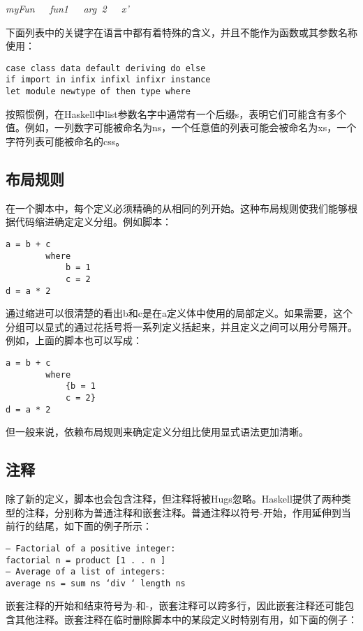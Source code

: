 \textit{myFun~~~fun1~~~arg~2~~~x’}

下面列表中的关键字在语言中都有着特殊的含义，并且不能作为函数或其参数名称使用：
\begin{verbatim}
case class data default deriving do else
if import in infix infixl infixr instance
let module newtype of then type where
\end{verbatim}

按照惯例，在Haskell中list参数名字中通常有一个后缀s，表明它们可能含有多个值。例如，一列数字可能被命名为ns，一个任意值的列表可能会被命名为xs，一个字符列表可能被命名的css。

\subsection{布局规则}

在一个脚本中，每个定义必须精确的从相同的列开始。这种布局规则使我们能够根据代码缩进确定定义分组。例如脚本：

\begin{verbatim}
a = b + c
        where 
            b = 1
            c = 2
d = a * 2
\end{verbatim}

通过缩进可以很清楚的看出b和c是在a定义体中使用的局部定义。如果需要，这个分组可以显式的通过花括号将一系列定义括起来，并且定义之间可以用分号隔开。例如，上面的脚本也可以写成：

\begin{verbatim}
a = b + c
        where 
            {b = 1
            c = 2}
d = a * 2
\end{verbatim}

但一般来说，依赖布局规则来确定定义分组比使用显式语法更加清晰。

\subsection{注释}

除了新的定义，脚本也会包含注释，但注释将被Hugs忽略。Haskell提供了两种类型的注释，分别称为普通注释和嵌套注释。普通注释以符号-开始，作用延伸到当前行的结尾，如下面的例子所示：

\begin{verbatim}
— Factorial of a positive integer:
factorial n = product [1 . . n ]
— Average of a list of integers:
average ns = sum ns ‘div ‘ length ns
\end{verbatim}

嵌套注释的开始和结束符号为{-和-}，嵌套注释可以跨多行，因此嵌套注释还可能包含其他注释。嵌套注释在临时删除脚本中的某段定义时特别有用，如下面的例子：

